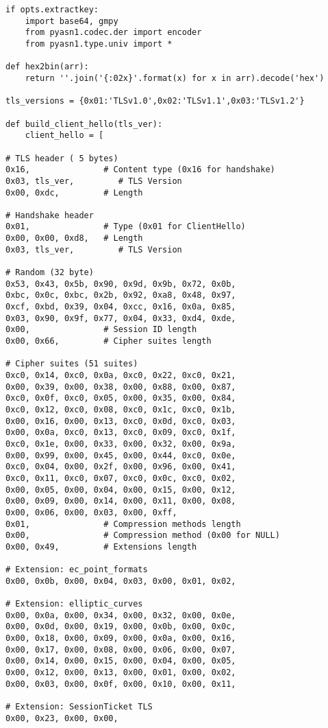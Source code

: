 \documentclass[a4paper,12pt]{article}
\begin{document}
\begin{verbatim}
if opts.extractkey:
    import base64, gmpy
    from pyasn1.codec.der import encoder
    from pyasn1.type.univ import *

def hex2bin(arr):
    return ''.join('{:02x}'.format(x) for x in arr).decode('hex')

tls_versions = {0x01:'TLSv1.0',0x02:'TLSv1.1',0x03:'TLSv1.2'}

def build_client_hello(tls_ver):
    client_hello = [

# TLS header ( 5 bytes)
0x16,               # Content type (0x16 for handshake)
0x03, tls_ver,         # TLS Version
0x00, 0xdc,         # Length

# Handshake header
0x01,               # Type (0x01 for ClientHello)
0x00, 0x00, 0xd8,   # Length
0x03, tls_ver,         # TLS Version

# Random (32 byte)
0x53, 0x43, 0x5b, 0x90, 0x9d, 0x9b, 0x72, 0x0b,
0xbc, 0x0c, 0xbc, 0x2b, 0x92, 0xa8, 0x48, 0x97,
0xcf, 0xbd, 0x39, 0x04, 0xcc, 0x16, 0x0a, 0x85,
0x03, 0x90, 0x9f, 0x77, 0x04, 0x33, 0xd4, 0xde,
0x00,               # Session ID length
0x00, 0x66,         # Cipher suites length

# Cipher suites (51 suites)
0xc0, 0x14, 0xc0, 0x0a, 0xc0, 0x22, 0xc0, 0x21,
0x00, 0x39, 0x00, 0x38, 0x00, 0x88, 0x00, 0x87,
0xc0, 0x0f, 0xc0, 0x05, 0x00, 0x35, 0x00, 0x84,
0xc0, 0x12, 0xc0, 0x08, 0xc0, 0x1c, 0xc0, 0x1b,
0x00, 0x16, 0x00, 0x13, 0xc0, 0x0d, 0xc0, 0x03,
0x00, 0x0a, 0xc0, 0x13, 0xc0, 0x09, 0xc0, 0x1f,
0xc0, 0x1e, 0x00, 0x33, 0x00, 0x32, 0x00, 0x9a,
0x00, 0x99, 0x00, 0x45, 0x00, 0x44, 0xc0, 0x0e,
0xc0, 0x04, 0x00, 0x2f, 0x00, 0x96, 0x00, 0x41,
0xc0, 0x11, 0xc0, 0x07, 0xc0, 0x0c, 0xc0, 0x02,
0x00, 0x05, 0x00, 0x04, 0x00, 0x15, 0x00, 0x12,
0x00, 0x09, 0x00, 0x14, 0x00, 0x11, 0x00, 0x08,
0x00, 0x06, 0x00, 0x03, 0x00, 0xff,
0x01,               # Compression methods length
0x00,               # Compression method (0x00 for NULL)
0x00, 0x49,         # Extensions length

# Extension: ec_point_formats
0x00, 0x0b, 0x00, 0x04, 0x03, 0x00, 0x01, 0x02,

# Extension: elliptic_curves
0x00, 0x0a, 0x00, 0x34, 0x00, 0x32, 0x00, 0x0e,
0x00, 0x0d, 0x00, 0x19, 0x00, 0x0b, 0x00, 0x0c,
0x00, 0x18, 0x00, 0x09, 0x00, 0x0a, 0x00, 0x16,
0x00, 0x17, 0x00, 0x08, 0x00, 0x06, 0x00, 0x07,
0x00, 0x14, 0x00, 0x15, 0x00, 0x04, 0x00, 0x05,
0x00, 0x12, 0x00, 0x13, 0x00, 0x01, 0x00, 0x02,
0x00, 0x03, 0x00, 0x0f, 0x00, 0x10, 0x00, 0x11,

# Extension: SessionTicket TLS
0x00, 0x23, 0x00, 0x00,


\end{verbatim}
\end{document}
